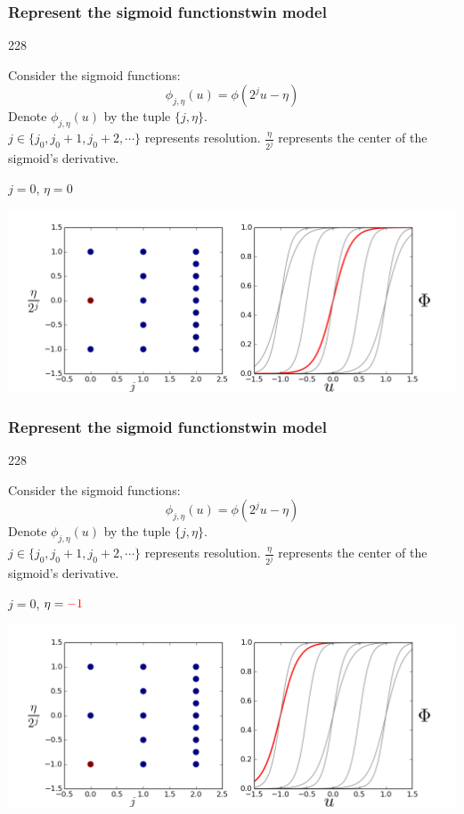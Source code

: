 \documentclass{beamer}
\newcommand{\barrow}{\item[\color{darkred}\ding{228}]}
\begin{document}
\setcounter{framenumber}{16}
\begin{frame}
    \frametitle{Represent the sigmoid functions\hfill \scriptsize{twin model}}\small
    \begin{dinglist}{228}
        \barrow
        Consider the sigmoid functions:
        $$
            \phi_{j, \eta}(u) = \phi(2^j u - \eta)
        $$
        Denote $\phi_{j, \eta}(u)$ by the tuple $\{j, \eta\}$.\\
        \vspace{.2cm}
        $j\in \{j_0, j_0+1, j_0+2, \cdots \}$ represents resolution. $\frac{\eta}{2^j}$ represents
        the center of the sigmoid's derivative.
        \barrow $j=0$, $\eta=0$\\
        \begin{center}
            \includegraphics[width=10.cm]{basis_0.png}
        \end{center}
    \end{dinglist}
\end{frame}


\setcounter{framenumber}{16}
\begin{frame}
    \frametitle{Represent the sigmoid functions\hfill \scriptsize{twin model}}\small
    \begin{dinglist}{228}
        \barrow
        Consider the sigmoid functions:
        $$
            \phi_{j, \eta}(u) = \phi(2^j u - \eta)
        $$
        Denote $\phi_{j, \eta}(u)$ by the tuple $\{j, \eta\}$.\\
        \vspace{.2cm}
        $j\in \{j_0, j_0+1, j_0+2, \cdots \}$ represents resolution. $\frac{\eta}{2^j}$ represents
        the center of the sigmoid's derivative.
        \barrow $j=0$, $\eta=\textcolor{red}{-1}$\\
        \begin{center}
            \includegraphics[width=10.cm]{basis_1.png}
        \end{center}
    \end{dinglist}
\end{frame}
\end{document}
